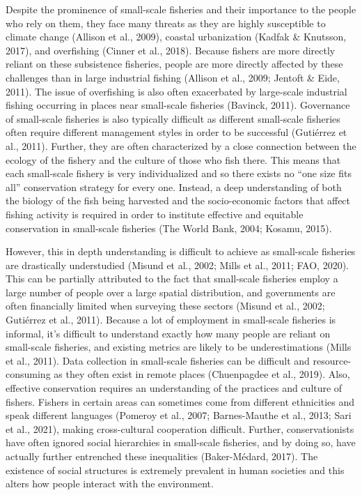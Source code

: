 \documentclass[
]{article}
\begin{document}
Despite the prominence of small-scale fisheries and their importance to the people who rely on them, they face many threats as they are highly susceptible to climate change (Allison et al., 2009), coastal urbanization (Kadfak \& Knutsson, 2017), and overfishing (Cinner et al., 2018). Because fishers are more directly reliant on these subsistence fisheries, people are more directly affected by these challenges than in large industrial fishing (Allison et al., 2009; Jentoft \& Eide, 2011). The issue of overfishing is also often exacerbated by large-scale industrial fishing occurring in places near small-scale fisheries (Bavinck, 2011). Governance of small-scale fisheries is also typically difficult as different small-scale fisheries often require different management styles in order to be successful (Gutiérrez et al., 2011). Further, they are often characterized by a close connection between the ecology of the fishery and the culture of those who fish there. This means that each small-scale fishery is very individualized and so there exists no ``one size fits all'' conservation strategy for every one. Instead, a deep understanding of both the biology of the fish being harvested and the socio-economic factors that affect fishing activity is required in order to institute effective and equitable conservation in small-scale fisheries (The World Bank, 2004; Kosamu, 2015).

However, this in depth understanding is difficult to achieve as small-scale fisheries are drastically understudied (Misund et al., 2002; Mills et al., 2011; FAO, 2020). This can be partially attributed to the fact that small-scale fisheries employ a large number of people over a large spatial distribution, and governments are often financially limited when surveying these sectors (Misund et al., 2002; Gutiérrez et al., 2011). Because a lot of employment in small-scale fisheries is informal, it's difficult to understand exactly how many people are reliant on small-scale fisheries, and existing metrics are likely to be underestimations (Mills et al., 2011). Data collection in small-scale fisheries can be difficult and resource-consuming as they often exist in remote places (Chuenpagdee et al., 2019). Also, effective conservation requires an understanding of the practices and culture of fishers. Fishers in certain areas can sometimes come from different ethnicities and speak different languages (Pomeroy et al., 2007; Barnes-Mauthe et al., 2013; Sari et al., 2021), making cross-cultural cooperation difficult. Further, conservationists have often ignored social hierarchies in small-scale fisheries, and by doing so, have actually further entrenched these inequalities (Baker-Médard, 2017). The existence of social structures is extremely prevalent in human societies and this alters how people interact with the environment.
\end{document}
